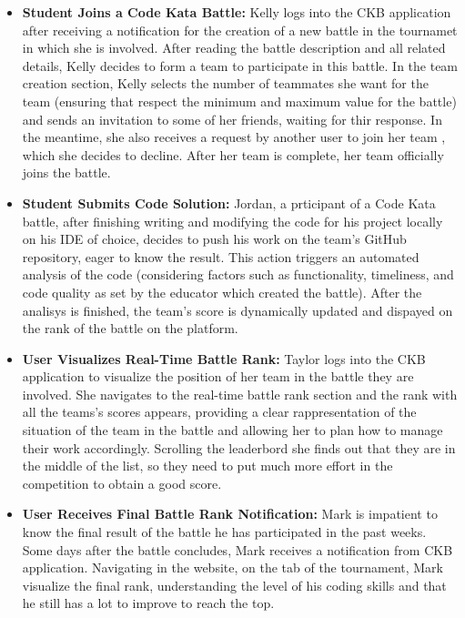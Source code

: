 \documentclass[a4paper, 11pt, titlepage]{article}
\begin{document}
\begin{itemize}
    \item \textbf{Student Joins a Code Kata Battle:} Kelly logs into the CKB application after receiving a notification
     for the creation of a new battle in the tournamet in which she is involved. After reading the battle description and all related details,
      Kelly decides to form a team to participate in this battle. In the team creation section, Kelly selects the number of teammates she want
       for the team (ensuring that respect the minimum and maximum value for the battle) and sends an invitation
        to some of her friends, waiting for thir response. In the meantime, she also receives a request by another user to join her team , which she decides to decline.
        After her team is complete, her team officially joins the battle.

    \item \textbf{Student Submits Code Solution:} Jordan, a prticipant of a Code Kata battle, after finishing writing and modifying the code for his project locally on his IDE of choice,
    decides to push his work on the team's GitHub repository, eager to know the result. This action triggers an automated 
    analysis of the code (considering factors such as functionality, timeliness, and code quality as set by the educator which created the battle). 
    After the analisys is finished, the team's score is dynamically updated and dispayed on the rank of the battle on the platform.

    \item \textbf{User Visualizes Real-Time Battle Rank:} Taylor logs into the CKB application to visualize the position
     of her team in the battle they are involved. She navigates to the real-time battle rank section and
      the rank with all the teams's scores appears, providing a clear rappresentation of the situation
       of the team in the battle and allowing her to plan how to manage their work accordingly. 
       Scrolling the leaderbord she finds out that they are in the middle of the list, so they need to put 
       much more effort in the competition to obtain a good score.

    \item \textbf{User Receives Final Battle Rank Notification:} Mark is impatient to know the final 
    result of the battle he has participated in the past weeks. Some days after the battle concludes, Mark receives
     a notification from CKB application. Navigating in the website, on the tab of the tournament, Mark visualize the 
     final rank, understanding the level of his coding skills and that he still has a lot to improve to 
     reach the top.


\end{itemize}
\end{document}
